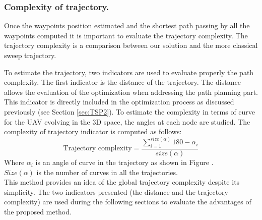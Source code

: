  
\subsubsection*{Complexity of trajectory. }\label{tarjectory}

Once the waypoints position estimated and the shortest path passing by all the waypoints computed it is important to evaluate the trajectory complexity. %
The trajectory complexity is a comparison between our solution and the more classical sweep trajectory.
 
To estimate the trajectory, two indicators are used to evaluate properly the path complexity. The first indicator is the distance of the trajectory. The distance allows the evaluation of the optimization when addressing the path planning part. This indicator is directly included in the optimization process as discussed previously (see Section \ref{sec:TSP2}). 
To estimate the complexity in terms of curve for the UAV evolving in the 3D space, the angles at each node are studied. 
The complexity of trajectory indicator is computed as follows: 
\begin{equation}\label{Eq:trajectory}
\mbox{Trajectory complexity}=\frac{ \sum_{i=1}^{size(\alpha)} 180- \alpha_{i}  }{size(\alpha)}   
\end{equation}
Where $\alpha_i$ is an angle of curve in the trajectory as shown in Figure . \\
$Size(\alpha)$ is the number of curves in all the trajectories.\\ 
This method provides an idea of the global trajectory complexity despite its simplicity. 
The two indicators presented (the distance and the trajectory complexity) are used during the following sections to evaluate the advantages of the proposed method.
	
